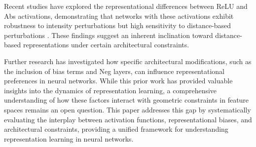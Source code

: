 Recent studies have explored the representational differences between ReLU and Abs activations, demonstrating that networks with these activations exhibit robustness to intensity perturbations but high sensitivity to distance-based perturbations \cite{oursland2024neural}. These findings suggest an inherent inclination toward distance-based representations under certain architectural constraints.

Further research has investigated how specific architectural modifications, such as the inclusion of bias terms and Neg layers, can influence representational preferences in neural networks. While this prior work has provided valuable insights into the dynamics of representation learning, a comprehensive understanding of how these factors interact with geometric constraints in feature spaces remains an open question. This paper addresses this gap by systematically evaluating the interplay between activation functions, representational biases, and architectural constraints, providing a unified framework for understanding representation learning in neural networks.
